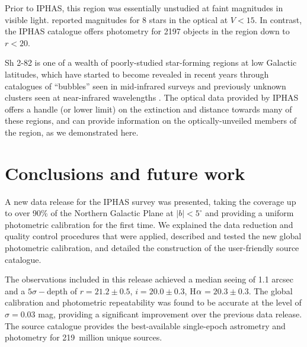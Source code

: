 \documentclass[useAMS,usenatbib]{mn2e}
\def\ha{\mbox{H$\rm \alpha$}}
\begin{document}
Prior to IPHAS, this region was essentially unstudied
at faint magnitudes in visible light.
\cite{Lahulla1985} reported magnitudes for 8 stars in the optical at 
$V < 15$. In contrast, the IPHAS catalogue offers photometry
for 2197 objects in the region down to $r<20$.

Sh 2-82 is one of a wealth of poorly-studied star-forming regions
at low Galactic latitudes,
which have started to become revealed
in recent years through catalogues
of ``bubbles'' seen
in mid-infrared surveys \cite[e.g.][]{Churchwell2006,Simpson2012}
and previously unknown clusters seen 
at near-infrared wavelengths \cite[e.g.][]{Bica2003}.
The optical data provided by IPHAS offers a handle (or lower limit)
on the extinction and distance towards many of these regions,
and can provide information on the optically-unveiled
members of the region, as we demonstrated here.


\section{Conclusions and future work}
\label{sec:conclusions}

A new data release for the IPHAS survey was presented,
taking the coverage up to over 90\% of the Northern Galactic Plane 
at $|b|<5^\circ$
and providing a uniform photometric calibration
for the first time.
We explained the data reduction and quality control procedures that
were applied, described and tested the new global photometric calibration,
and detailed the construction of the user-friendly source catalogue.

The observations included in this release
achieved a median seeing of 1.1 arcsec
and a $5\sigma-$depth of $r=21.2\pm 0.5$, $i=20.0\pm 0.3$, \ha$=20.3\pm 0.3$.
The global calibration and photometric repeatability
was found to be accurate at the level of $\sigma=0.03$ mag,
providing a significant improvement over the 
previous data release.
The source catalogue provides the best-available
single-epoch astrometry and photometry
for 219~million unique sources.
\end{document}
